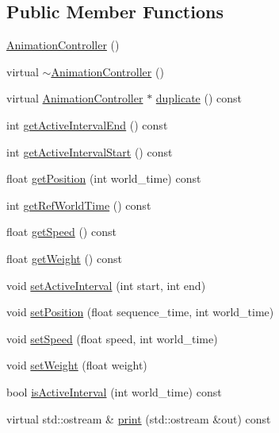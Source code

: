 \subsection*{Public Member Functions}
\begin{CompactItemize}
\item 
\hyperlink{classm3g_1_1AnimationController_f2e8cb2c6c916983d0f87140c7b0c98e}{AnimationController} ()
\item 
virtual \hyperlink{classm3g_1_1AnimationController_346849d0f82278f30dda9f35f80e9dbe}{$\sim$AnimationController} ()
\item 
virtual \hyperlink{classm3g_1_1AnimationController}{AnimationController} $\ast$ \hyperlink{classm3g_1_1AnimationController_aab6521891038ced0961ecb78611646e}{duplicate} () const 
\item 
int \hyperlink{classm3g_1_1AnimationController_7caa95c7ed5a03844abe328feaae4911}{getActiveIntervalEnd} () const 
\item 
int \hyperlink{classm3g_1_1AnimationController_c66e837ae4152477eabdfcbe7fb21adb}{getActiveIntervalStart} () const 
\item 
float \hyperlink{classm3g_1_1AnimationController_dfdea73153cb34c26979575efda149e2}{getPosition} (int world\_\-time) const 
\item 
int \hyperlink{classm3g_1_1AnimationController_103e1bd81eba2cc90f31e7fdc4f3c601}{getRefWorldTime} () const 
\item 
float \hyperlink{classm3g_1_1AnimationController_4ab87c5df7c3eadd17b318a426773fcb}{getSpeed} () const 
\item 
float \hyperlink{classm3g_1_1AnimationController_a17d38dafd3d75c59f0609f037fbe5ae}{getWeight} () const 
\item 
void \hyperlink{classm3g_1_1AnimationController_a4cba877288d7a188477e0a756fd2f58}{setActiveInterval} (int start, int end)
\item 
void \hyperlink{classm3g_1_1AnimationController_da0d7a404b2a75ee182ca6351cf673d5}{setPosition} (float sequence\_\-time, int world\_\-time)
\item 
void \hyperlink{classm3g_1_1AnimationController_b32791d1a51df9ac8028792a841d06a6}{setSpeed} (float speed, int world\_\-time)
\item 
void \hyperlink{classm3g_1_1AnimationController_8859df4d5a61714012bf9e1240189aed}{setWeight} (float weight)
\item 
bool \hyperlink{classm3g_1_1AnimationController_8db30a5f125f5b22a1cde9e41d93c2f0}{isActiveInterval} (int world\_\-time) const 
\item 
virtual std::ostream \& \hyperlink{classm3g_1_1AnimationController_6fea17fa1532df3794f8cb39cb4f911f}{print} (std::ostream \&out) const 
\end{CompactItemize}


